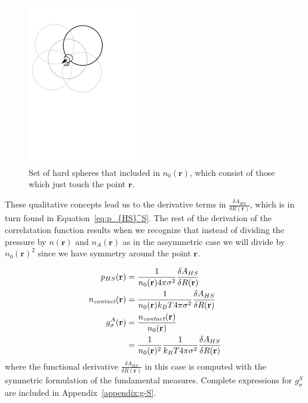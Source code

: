 \documentclass[letterpaper,twocolumn,amsmath,amssymb,jcp,10pt,aip]{revtex4-1}
\newcommand{\rr}{\textbf{r}}
\begin{document}
\begin{figure}
\includegraphics[width=5cm]{figs/contact}
\caption{Set of hard spheres that included in $n_0(\mathbf{r})$, which
  consist of those which just touch the point $\mathbf{r}$.}
\label{fig:contact}
\end{figure}

These qualitative concepts lead us to the derivative terms in $\frac{\delta A_{HS}}{\delta R(\mathbf{r})}$, 
which is in turn found in Equation~\ref{eq:p_{HS}^S}.  The rest of the 
derivation of the correlatation function results when we recognize that 
instead of dividing the pressure by $n(\mathbf{r})$ and $n_A(\mathbf{r})$ 
as in the assymmetric case we will divide by $n_0(\mathbf{r})^2$
since we have symmetry around the point $\mathbf{r}$.

\begin{align}
  p_{HS}(\mathbf{r}) &= \frac{1}{n_0(\rr) 4\pi \sigma^2} \frac{\delta
    A_{HS}}{\delta R(\mathbf{r})} \label{eq:p_{HS}^S}\\
  \ncontact(\rr) &= \frac{1}{n_0(\rr) k_BT 4\pi \sigma^2} \frac{\delta
    A_{HS}}{\delta R(\mathbf{r})} \\
  g_\sigma^A(\rr) &= \frac{\ncontact(\rr)}{n_0(\rr)} \\
  &= \frac{1}{n_0(\rr)^2}\frac{1}{ k_BT 4\pi \sigma^2} \frac{\delta
    A_{HS}}{\delta R(\mathbf{r})} \label{eq:g-A-exact}
\end{align}
where the functional derivative $\frac{\delta A_{HS}}{\delta
  R(\mathbf{r})}$ in this case is computed with the symmetric
formulation of the fundamental measures.  Complete expressions for
$g_\sigma^S$ are included in Appendix~\ref{appendix:g-S}.\\
\end{document}
